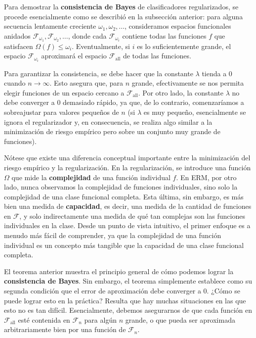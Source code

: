 \documentclass{article}
\begin{document}
Para demostrar la \textbf{consistencia de Bayes} de clasificadores regularizados, se procede esencialmente como 
se describió en la subsección anterior: para alguna secuencia lentamente creciente \(\omega_1, \omega_2, \dots\), 
consideramos espacios funcionales anidados \(\mathcal{F}_{\omega_1}, \mathcal{F}_{\omega_2}, \dots\), donde cada 
\(\mathcal{F}_{\omega_i}\) contiene todas las funciones \(f\) que satisfacen \(\Omega(f) \leq \omega_i\). 
Eventualmente, si \(i\) es lo suficientemente grande, el espacio \(\mathcal{F}_{\omega_i}\) aproximará el 
espacio \(\mathcal{F}_{\text{all}}\) de todas las funciones.\newline

Para garantizar la consistencia, se debe hacer que la constante \(\lambda\) tienda a \(0\) cuando \(n \to \infty\). 
Esto asegura que, para \(n\) grande, efectivamente se nos permita elegir funciones de un espacio cercano a 
\(\mathcal{F}_{\text{all}}\). Por otro lado, la constante \(\lambda\) no debe converger a \(0\) demasiado rápido, 
ya que, de lo contrario, comenzaríamos a sobreajustar para valores pequeños de \(n\) (si \(\lambda\) es muy 
pequeño, esencialmente se ignora el regularizador y, en consecuencia, se realiza algo similar a la minimización
de riesgo empírico pero sobre un conjunto muy grande de funciones).\newline

Nótese que existe una diferencia conceptual importante entre la minimización del riesgo empírico y la 
regularización. En la regularización, se introduce una función \(\Omega\) que mide la \textbf{complejidad} de 
una función individual \(f\). En ERM, por otro lado, nunca observamos la complejidad de funciones individuales, 
sino solo la complejidad de una clase funcional completa. Esta última, sin embargo, es más bien una medida de 
\textbf{capacidad}, es decir, una medida de la cantidad de funciones en \(\mathcal{F}\), y solo indirectamente 
una medida de qué tan complejas son las funciones individuales en la clase. Desde un punto de vista intuitivo, 
el primer enfoque es a menudo más fácil de comprender, ya que la complejidad de una función individual es un 
concepto más tangible que la capacidad de una clase funcional completa.\newline

El teorema anterior muestra el principio general de cómo podemos lograr la \textbf{consistencia de Bayes}. 
Sin embargo, el teorema simplemente establece como su segunda condición que el error de aproximación 
debe converger a \(0\). ¿Cómo se puede lograr esto en la práctica? Resulta que hay muchas situaciones 
en las que esto no es tan difícil. Esencialmente, debemos asegurarnos de que cada función en 
\(\mathcal{F}_{\text{all}}\) esté contenida en \(\mathcal{F}_n\) para algún \(n\) grande, o que pueda 
ser aproximada arbitrariamente bien por una función de \(\mathcal{F}_n\).\newline
\end{document}
